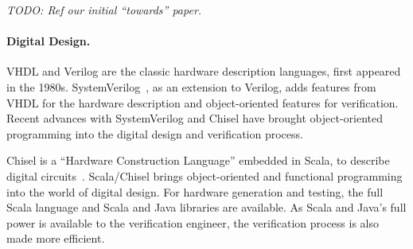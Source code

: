 \documentclass[fleqn,12pt]{article}
\newcommand{\todo}[1]{{\it TODO: #1}}
\begin{document}
\todo{Ref our initial ``towards'' paper.}


\paragraph{Digital Design.}
VHDL and Verilog are the classic hardware description languages, first appeared in the 1980s.
SystemVerilog~\cite{SystemVerilog}, as an extension to Verilog, adds features from VHDL
for the hardware description and object-oriented features for verification.
Recent advances with SystemVerilog and Chisel \cite{chisel:dac2012, chisel:book} have
brought object-oriented programming into the digital design and verification process.

Chisel is a ``Hardware Construction Language'' embedded in Scala, to describe digital circuits~\cite{chisel:dac2012}.
Scala/Chisel brings object-oriented and functional programming into the world of digital design.
For hardware generation and testing, the full Scala language and Scala and Java libraries are available.
As Scala and Java's full power is available to the verification engineer,
the verification process is also made more efficient.


%
\end{document}
